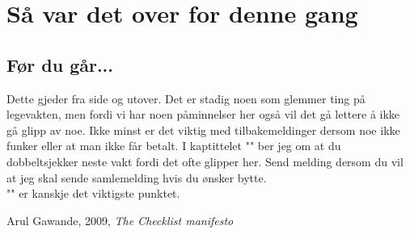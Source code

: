 \documentclass[12pt,a4paper]{memoir}
\begin{document}
\chapter{Så var det over for denne gang}\label{chap:desc_lv_slutt}	 
	\section{Før du går...}
	Dette gjeder fra side \pageref{sec:elv_regns} og utover. Det er stadig noen som glemmer ting på legevakten, men fordi vi har noen påminnelser her også vil det gå lettere å ikke gå glipp av noe. Ikke minst er det viktig med tilbakemeldinger dersom noe ikke funker eller at man ikke får betalt. I kaptittelet "" ber jeg om at du dobbeltsjekker neste vakt fordi det ofte glipper her. Send melding dersom du vil at jeg skal sende samlemelding hvis du ønsker bytte.\\

	"" er kanskje det viktigste punktet. 


\appendix
 	\renewcommand{\labelitemi}{$\Box$}%
 	\renewcommand{\labelitemii}{$\Box$}%



\newpage



\begin{thebibliography}{99}

  Arul Gawande, 2009, \emph{The Checklist manifesto}

\end{thebibliography}

\newpage
\listoffigures
\end{document}
